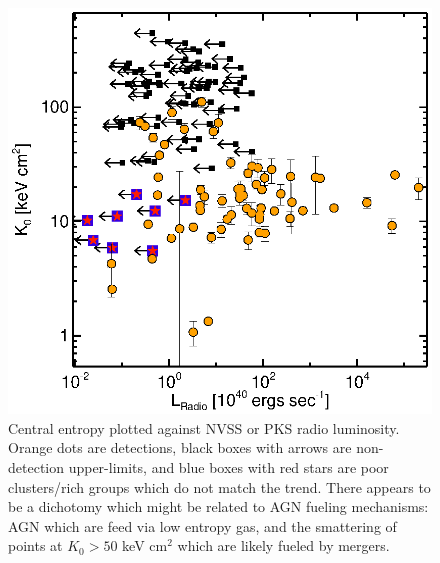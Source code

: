 \documentclass[11pt]{article}
\begin{document}
\begin{figure}[t]
\begin{minipage}[t]{0.5\linewidth}
        \includegraphics*[width=\textwidth, trim=28mm 8mm 30mm 10mm, clip]{rad}
        \caption{\small Central entropy plotted against NVSS or PKS radio
	luminosity. Orange dots are detections, black boxes with
	arrows are non-detection upper-limits, and blue boxes with red stars
	are poor clusters/rich groups which do not match the
	trend. There appears to be a dichotomy which might be related to AGN
	fueling mechanisms: AGN which are feed via low entropy gas, and the
	smattering of points at $K_0 > 50$ keV cm$^2$ which are likely
	fueled by mergers.}
        \label{fig:rad}
    \end{minipage}
\end{figure}
\end{document}
